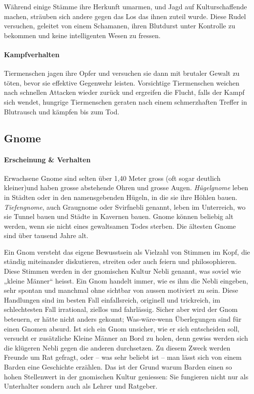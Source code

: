 \documentclass[12pt,twoside,twocolumn,openany]{book}
\begin{document}
Während einige Stämme ihre Herkunft umarmen, und Jagd auf Kulturschaffende machen, sträuben sich andere gegen das Los das ihnen zuteil wurde. Diese Rudel versuchen, geleitet von einem Schamanen, ihren Blutdurst unter Kontrolle zu bekommen und keine intelligenten Wesen zu fressen.

\paragraph{Kampfverhalten}
Tiermenschen jagen ihre Opfer und versuchen sie dann mit brutaler Gewalt zu töten, bevor sie effektive Gegenwehr leisten. Vorsichtige Tiermenschen weichen nach schnellen Attacken wieder zurück und ergreifen die Flucht, falls der Kampf sich wendet, hungrige Tiermenschen geraten nach einem schmerzhaften Treffer in Blutrausch und kämpfen bis zum Tod.

\subsection{Gnome}

\paragraph{Erscheinung \& Verhalten}	
Erwachsene Gnome sind selten über 1,40 Meter gross (oft sogar deutlich kleiner)und haben grosse abstehende Ohren und grosse Augen. \emph{Hügelgnome} leben in Städten oder in den namensgebenden Hügeln, in die sie ihre Höhlen bauen. \emph{Tiefengnome}, auch Graugnome oder Svirfnebli genannt, leben im Unterreich, wo sie Tunnel bauen und Städte in Kavernen bauen. Gnome können beliebig alt werden, wenn sie nicht eines gewaltsamen Todes sterben. Die ältesten Gnome sind über tausend Jahre alt.

Ein Gnom versteht das eigene Bewusstsein als Vielzahl von Stimmen im Kopf, die ständig miteinander diskutieren, streiten oder auch feiern und philosophieren. Diese Stimmen werden in der gnomischen Kultur Nebli genannt, was soviel wie „kleine Männer“ heisst.
Ein Gnom handelt immer, wie es ihm die Nebli eingeben, sehr spontan und manchmal ohne sichtbar von aussen motiviert zu sein. Diese Handlungen sind im besten Fall einfallsreich, originell und trickreich, im schlechtesten Fall irrational, ziellos und fahrlässig. Sicher aber wird der Gnom beteuern, er hätte nicht anders gekonnt; Was-wäre-wenn Überlegungen sind für einen Gnomen absurd. Ist sich ein Gnom unsicher, wie er sich entscheiden soll, versucht er zusätzliche Kleine Männer an Bord zu holen, denn gewiss werden sich die klügeren Nebli gegen die anderen durchsetzen.  Zu diesem Zweck werden Freunde um Rat gefragt, oder – was sehr beliebt ist – man lässt sich von einem Barden eine Geschichte erzählen. Das ist der Grund warum Barden einen so hohen Stellenwert in der gnomischen Kultur geniessen: Sie fungieren nicht nur als Unterhalter sondern auch als Lehrer und Ratgeber.
\end{document}
